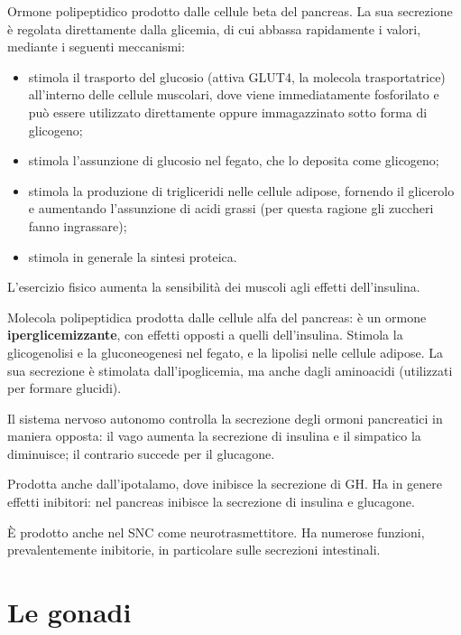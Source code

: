 Ormone polipeptidico prodotto dalle cellule beta del pancreas. La sua
secrezione è regolata direttamente dalla glicemia, di cui abbassa
rapidamente i valori, mediante i seguenti meccanismi:
\begin{itemize}
  \item stimola il trasporto del glucosio (attiva GLUT4, la molecola
    trasportatrice) all'interno delle cellule muscolari, dove viene
    immediatamente fosforilato e può essere utilizzato direttamente oppure
    immagazzinato sotto forma di glicogeno;
  \item stimola l'assunzione di glucosio nel fegato, che lo deposita come
    glicogeno;
  \item stimola la produzione di trigliceridi nelle cellule adipose,
    fornendo il glicerolo e aumentando l'assunzione di acidi grassi (per
    questa ragione gli zuccheri fanno ingrassare);
  \item stimola in generale la sintesi proteica.
\end{itemize}
L'esercizio fisico aumenta la sensibilità dei muscoli agli effetti
dell'insulina.

Molecola polipeptidica prodotta dalle cellule alfa del pancreas: è un
ormone \textbf{iperglicemizzante}, con effetti opposti a quelli
dell'insulina. Stimola la glicogenolisi e la gluconeogenesi nel fegato, e
la lipolisi nelle cellule adipose. La sua secrezione è stimolata
dall'ipoglicemia, ma anche dagli aminoacidi (utilizzati per formare
glucidi).

Il sistema nervoso autonomo controlla la secrezione degli ormoni
pancreatici in maniera opposta: il vago aumenta la secrezione di insulina e
il simpatico la diminuisce; il contrario succede per il glucagone.

Prodotta anche dall'ipotalamo, dove inibisce la secrezione di GH. Ha in
genere effetti inibitori: nel pancreas inibisce la secrezione di insulina e
glucagone.

È prodotto anche nel SNC come neurotrasmettitore. Ha numerose funzioni,
prevalentemente inibitorie, in particolare sulle secrezioni intestinali.

\section{Le gonadi}

